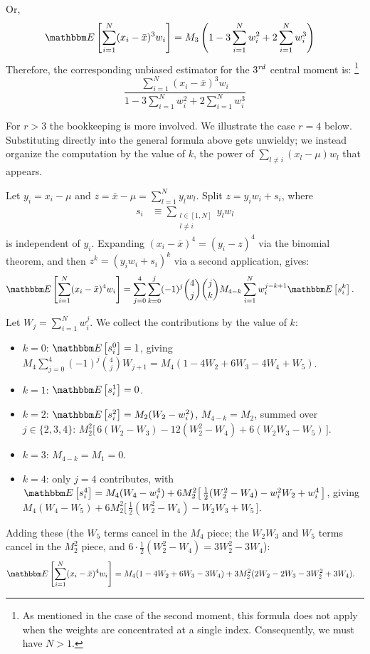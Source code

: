 \documentclass{article}
\newcommand{\E}[1]{\mathbbm E\left[#1\right]}
\begin{document}
Or,
\begin{align}
    \E{\sum_{i=1}^N (x_i - {\bar x})^3 w_i} &= M_3\left(1 - 3\sum_{i=1}^N w_i^2 + 2\sum_{i=1}^N w_i^3\right)
\end{align}
Therefore, the corresponding unbiased estimator for the $3^{\it rd}$ central moment is:%
\footnote{As mentioned in the case of the second moment, this formula does not apply when
the weights are concentrated at a single index. Consequently, we must have $N > 1$.}
\begin{equation}
    \frac{\sum_{i=1}^N (x_i - {\bar x})^3 w_i}{1 - 3\sum_{i=1}^N w_i^2 + 2\sum_{i=1}^N w_i^3}
\end{equation}


For $r > 3$ the bookkeeping is more involved. We illustrate the case $r = 4$
below. Substituting directly into the general formula above gets unwieldy;
we instead organize the computation by the value of $k$, the power of
$\sum_{l \neq i} (x_l - \mu) w_l$ that appears.

Let $y_i = x_i - \mu$ and $z = {\bar x} - \mu = \sum_{l=1}^N y_l w_l$. Split
$z = y_i w_i + s_i$, where
\begin{align*}
    s_i &\equiv \sum_{\substack{l \in [1,N]\\ l \neq i}} y_l w_l
\end{align*}
is independent of $y_i$. Expanding $(x_i - {\bar x})^4 = (y_i - z)^4$ via the
binomial theorem, and then $z^k = (y_i w_i + s_i)^k$ via a second application,
gives:
\begin{align}
    \E{\sum_{i=1}^N (x_i - {\bar x})^4 w_i} &= \sum_{j=0}^4 \sum_{k=0}^j (-1)^j \binom{4}{j} \binom{j}{k} M_{4-k} \sum_{i=1}^N w_i^{j-k+1} \E{s_i^k}.
    \label{r4_master}
\end{align}

Let $W_j = \sum_{i=1}^N w_i^j$. We collect the contributions by the value of $k$:
\begin{itemize}
    \item $k=0$: $\E{s_i^0} = 1$, giving
        $M_4 \sum_{j=0}^4 (-1)^j \binom{4}{j} W_{j+1} = M_4 (1 - 4 W_2 + 6 W_3 - 4 W_4 + W_5)$.
    \item $k=1$: $\E{s_i^1} = 0$.
    \item $k=2$: $\E{s_i^2} = M_2 (W_2 - w_i^2)$, $M_{4-k} = M_2$, summed over $j \in \{2,3,4\}$:
        $M_2^2 \big[\,6 (W_2 - W_3) - 12 (W_2^2 - W_4) + 6 (W_2 W_3 - W_5)\,\big]$.
    \item $k=3$: $M_{4-k} = M_1 = 0$.
    \item $k=4$: only $j=4$ contributes, with $\E{s_i^4} = M_4 (W_4 - w_i^4) + 6 M_2^2 \big[\,\tfrac{1}{2}(W_2^2 - W_4) - w_i^2 W_2 + w_i^4\,\big]$, giving
        $M_4 (W_4 - W_5) + 6 M_2^2 \big[\,\tfrac{1}{2}(W_2^2 - W_4) - W_2 W_3 + W_5\,\big]$.
\end{itemize}
Adding these (the $W_5$ terms cancel in the $M_4$ piece; the $W_2 W_3$ and $W_5$
terms cancel in the $M_2^2$ piece, and $6 \cdot \tfrac{1}{2}(W_2^2 - W_4) = 3 W_2^2 - 3 W_4$):
\begin{align}
    \E{\sum_{i=1}^N (x_i - {\bar x})^4 w_i} &= M_4 (1 - 4 W_2 + 6 W_3 - 3 W_4)
    + 3 M_2^2 (2 W_2 - 2 W_3 - 3 W_2^2 + 3 W_4).
    \label{r4_final}
\end{align}
\end{document}
